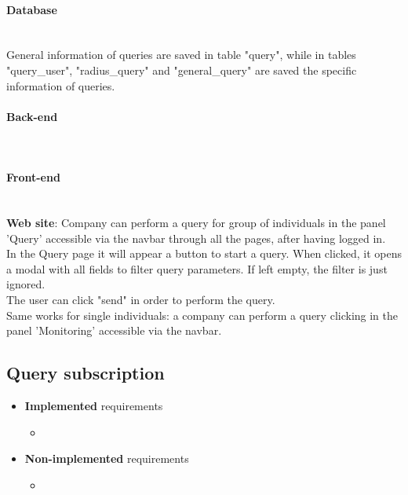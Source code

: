 \paragraph{Database} \mbox{}\\ 
General information of queries are saved in table "query", while in tables "query\_user", "radius\_query" and "general\_query" are saved the specific information of queries.

\paragraph{Back-end} \mbox{}\\  
\paragraph{Front-end} \mbox{}\\
\textbf{Web site}: Company can perform a query for group of individuals in the panel 'Query' accessible via the navbar through all the pages, after having logged in.\\
In the Query page it will appear a button to start a query. When clicked, it opens a modal with all fields to filter query parameters.
If left empty, the filter is just ignored.\\
The user can click "send" in order to perform the query.\\
Same works for single individuals: a company can perform a query clicking in the panel 'Monitoring' accessible via the navbar.

\subsection{Query subscription}
\begin{itemize}
    \item \textbf{Implemented} requirements
        \begin{itemize}
            \item 
        \end{itemize}
    \item \textbf{Non-implemented} requirements
    \begin{itemize}
            \item 
        \end{itemize}
\end{itemize}


